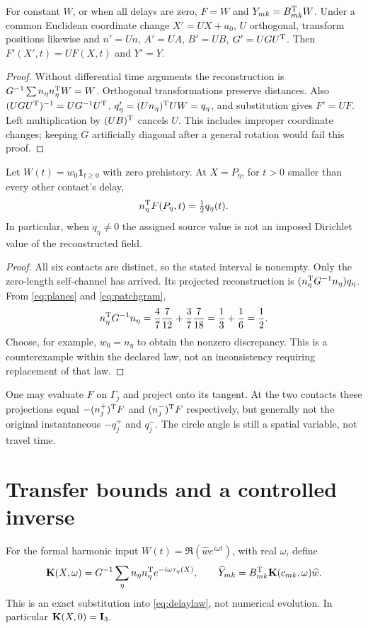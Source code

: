 \begin{proposition}\label{prop:baseline}
For constant $W$, or when all delays are zero, $F=W$ and $Y_{mk}=B_{mk}^{\mathrm T} W$. Under a common Euclidean coordinate change $X'=UX+a_0$, $U$ orthogonal, transform positions likewise and $n'=Un$, $A'=UA$, $B'=UB$, $G'=UGU^{\mathrm T}$. Then $F'(X',t)=UF(X,t)$ and $Y'=Y$.
\end{proposition}
\begin{proof}
Without differential time arguments the reconstruction is $G^{-1}\sum n_\eta n_\eta^{\mathrm T} W=W$. Orthogonal transformations preserve distances. Also $(UGU^{\mathrm T})^{-1}=UG^{-1}U^{\mathrm T}$, $q'_\eta=(Un_\eta)^{\mathrm T} UW=q_\eta$, and substitution gives $F'=UF$. Left multiplication by $(UB)^{\mathrm T}$ cancels $U$. This includes improper coordinate changes; keeping $G$ artificially diagonal after a general rotation would fail this proof.
\end{proof}

\begin{proposition}\label{prop:half}
Let $W(t)=w_0\mathbf1_{t\ge0}$ with zero prehistory. At $X=P_\eta$, for $t>0$ smaller than every other contact's delay,
\begin{equation}\label{eq:half}
n_\eta^{\mathrm T} F(P_\eta,t)=\tfrac12 q_\eta(t).
\end{equation}
In particular, when $q_\eta\ne0$ the assigned source value is not an imposed Dirichlet value of the reconstructed field.
\end{proposition}
\begin{proof}
All six contacts are distinct, so the stated interval is nonempty. Only the zero-length self-channel has arrived. Its projected reconstruction is $(n_\eta^{\mathrm T} G^{-1}n_\eta)q_\eta$. From \eqref{eq:planes} and \eqref{eq:patchgram},
\[
n_\eta^{\mathrm T} G^{-1}n_\eta=\frac47\frac7{12}+\frac37\frac7{18}
=\frac13+\frac16=\frac12.
\]
Choose, for example, $w_0=n_\eta$ to obtain the nonzero discrepancy. This is a counterexample within the declared law, not an inconsistency requiring replacement of that law.
\end{proof}
One may evaluate $F$ on $\Gamma_j$ and project onto its tangent. At the two contacts these projections equal $-(n_j^+)^{\mathrm T} F$ and $(n_j^-)^{\mathrm T} F$ respectively, but generally not the original instantaneous $-q_j^+$ and $q_j^-$. The circle angle is still a spatial variable, not travel time.

\section{Transfer bounds and a controlled inverse}\label{sec:transfer}
For the formal harmonic input $W(t)=\Re(\widehat w e^{i\omega t})$, with real $\omega$, define
\begin{equation}\label{eq:transfer}
\mathbf K(X,\omega)=G^{-1}\sum_\eta n_\eta n_\eta^{\mathrm T} e^{-i\omega\tau_\eta(X)},
\qquad \widehat Y_{mk}=B_{mk}^{\mathrm T}\mathbf K(c_{mk},\omega)\widehat w.
\end{equation}
This is an exact substitution into \eqref{eq:delaylaw}, not numerical evolution. In particular $\mathbf K(X,0)=\mathbf I_3$.

